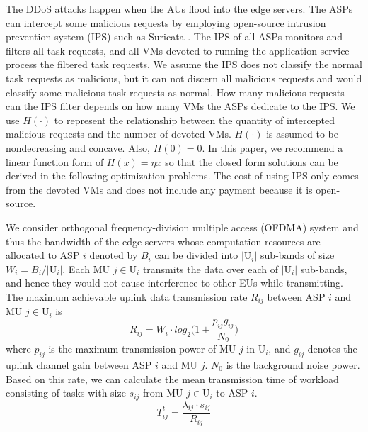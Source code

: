 \documentclass[conference]{IEEEtran}
\begin{document}
The DDoS attacks happen when the AUs flood into the edge servers. The ASPs can intercept some malicious requests by employing open-source intrusion prevention system (IPS) such as Suricata \cite{Suricata}. The IPS of all ASPs monitors and filters all task requests, and all VMs devoted to running the application service process the filtered task requests. We assume the IPS does not classify the normal task requests as malicious, but it can not discern all malicious requests and would classify some malicious task requests as normal. How many malicious requests can the IPS filter depends on how many VMs the ASPs dedicate to the IPS. We use $H(\cdot)$ to represent the relationship between the quantity of intercepted malicious requests and the number of devoted VMs. $H(\cdot)$ is assumed to be nondecreasing and concave. Also, $H(0)=0$. In this paper, we recommend a linear function form of $H(x) = \eta{x}$ so that the closed form solutions can be derived in the following optimization problems. The cost of using IPS only comes from the devoted VMs and does not include any payment because it is open-source.

We consider orthogonal frequency-division multiple access (OFDMA) system and thus the bandwidth of the edge servers whose computation resources are allocated to ASP $i$ denoted by $B_i$ can be divided into $|\mathrm{U}_i|$ sub-bands of size $W_{i} = B_i/|\mathrm{U}_i|$. Each MU $j\in \mathrm{U}_i$ transmits the data over each of $|\mathrm{U}_i|$ sub-bands, and hence they would not cause interference to other EUs while transmitting. The maximum achievable uplink data transmission rate $R_{ij}$ between ASP $i$ and MU $j \in \mathrm{U}_i$ is
\begin{equation} \label{eqn:shannon}
R_{ij}=W_i \cdot log_2\Big(1+\frac{p_{ij}g_{ij}}{N_{0}}\Big)
\end{equation}
where $p_{ij}$ is the maximum transmission power of MU $j$ in $\mathrm{U}_i$, and $g_{ij}$ denotes the uplink channel gain between ASP $i$ and MU $j$. $N_0$ is the background noise power. Based on this rate, we can calculate the mean transmission time of workload consisting of tasks with size $s_{ij}$ from MU $j \in \mathrm{U}_i$ to ASP $i$.
\begin{equation}
T_{ij}^t=\frac{\lambda_{ij} \cdot s_{ij}}{R_{ij}}
\end{equation}
\end{document}
